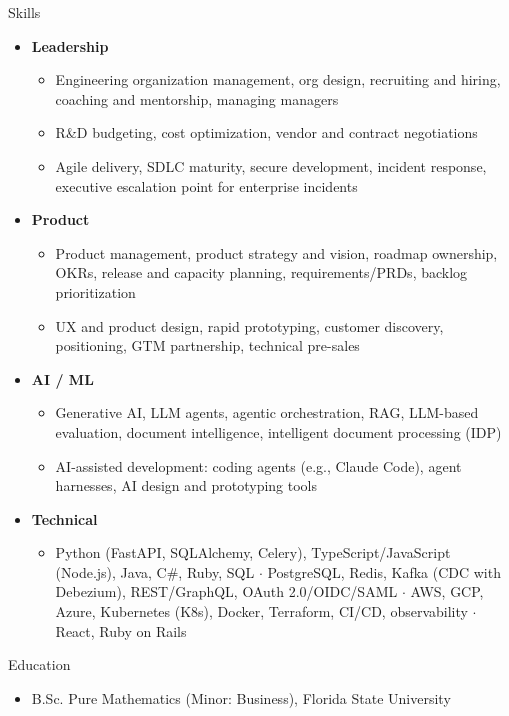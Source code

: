 \documentclass[10pt,oneside]{article}
\newenvironment{ressection}[1]{
  \vspace{4pt}
  {\fontfamily{phv}\selectfont\Large#1}
  \begin{itemize}
    \vspace{3pt}
}{
  \end{itemize}
}
\newcommand{\resitem}[1]{
  \vspace{-4pt}
\item \begin{flushleft} #1 \end{flushleft}
}
\newcommand{\ressubitem}[1]{
  \vspace{-1pt}
\item \begin{flushleft} #1 \end{flushleft}
}
\newenvironment{reslist}[1]{
  \resitem{\textbf{#1}}
  \vspace{-5pt}
  \begin{itemize}
}{
  \end{itemize}
}
\begin{document}
\begin{ressection}{Skills}
  \begin{reslist}{Leadership}
    \ressubitem{Engineering organization management, org design, recruiting and hiring, coaching and mentorship, managing managers}
    \ressubitem{R\&D budgeting, cost optimization, vendor and contract negotiations}
    \ressubitem{Agile delivery, SDLC maturity, secure development, incident response, executive escalation point for enterprise incidents}
  \end{reslist}
  \begin{reslist}{Product}
    \ressubitem{Product management, product strategy and vision, roadmap ownership, OKRs, release and capacity planning, requirements/PRDs, backlog prioritization}
    \ressubitem{UX and product design, rapid prototyping, customer discovery, positioning, GTM partnership, technical pre-sales}
  \end{reslist}
  \begin{reslist}{AI / ML}
    \ressubitem{Generative AI, LLM agents, agentic orchestration, RAG, LLM-based evaluation, document intelligence, intelligent document processing (IDP)}
    \ressubitem{AI-assisted development: coding agents (e.g., Claude Code), agent harnesses, AI design and prototyping tools}
  \end{reslist}
  \begin{reslist}{Technical}
    \ressubitem{Python (FastAPI, SQLAlchemy, Celery), TypeScript/JavaScript (Node.js), Java, C\#, Ruby, SQL $\cdot$ PostgreSQL, Redis, Kafka (CDC with Debezium), REST/GraphQL, OAuth 2.0/OIDC/SAML $\cdot$ AWS, GCP, Azure, Kubernetes (K8s), Docker, Terraform, CI/CD, observability $\cdot$ React, Ruby on Rails}
  \end{reslist}
\end{ressection}

\begin{ressection}{Education}
  \ressubitem{B.Sc. Pure Mathematics (Minor: Business), Florida State University}
\end{ressection}
\end{document}
